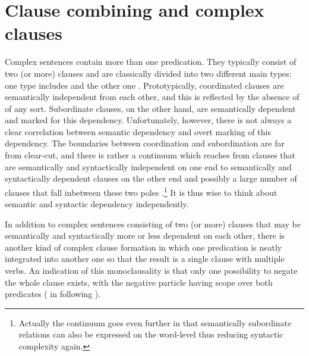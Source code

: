 \chapter[Clause combining and complex clauses]{Clause combining and complex clauses}\label{sec:ComplexClauses}

Complex sentences contain more than one predication. They typically consist of two (or more) clauses and are classically divided into two different main types: one type includes  and the other one . Prototypically, coordinated clauses are semantically independent from each other, and this is reflected by the absence of  of any sort. Subordinate clauses, on the other hand, are semantically dependent and marked for this dependency. Unfortunately, however, there is not always a clear correlation between semantic dependency and overt marking of this dependency. The boundaries between coordination and subordination are far from clear-cut, and there is rather a continuum which reaches from clauses that are semantically and syntactically independent on one end to semantically and syntactically dependent clauses on the other end and possibly a large number of clauses that fall inbetween these two poles  \citep[cf.][]{Lehmann1988}.\footnote{Actually the continuum goes even further in that semantically subordinate relations can also be expressed on the word-level thus reducing syntactic complexity again.} It is thus wise to think about semantic and syntactic dependency independently. 

In addition to complex sentences consisting of two (or more) clauses that may be semantically and syntactically more or less dependent on each other, there is another kind of complex clause formation in which one predication is neatly integrated into another one so that the result is a single clause with multiple verbs. An indication of this monoclausality is that only one possibility to negate the whole clause exists, with the negative particle having scope over both predicates (\citealp[cf.][299]{Haspelmath2016} in following \citealt[501]{Bohnemeyer2007}).

